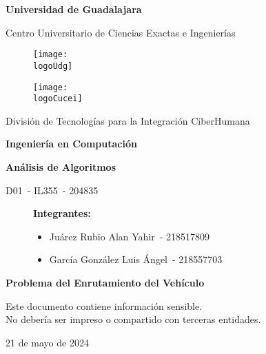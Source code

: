 \documentclass[10pt,twocolumn,letterpaper]{article}
\date{}
\title{
	\vspace*{-1cm}	\fontsize{24}{28.8}\selectfont \theTitle
}
\author{\theAuthor}
\author{\bAuthor}
\affil{\small
	\textit{CENTRO UNIVERSITARIO DE CIENCIAS}\\
	\textit{EXACTAS E INGENIERÍAS, (CUCEI, UDG)}
}
\affil{
	\fontfamily{pcr}\selectfont
	\theAuthorMail\\
	\fontfamily{pcr}\selectfont
	\bAuthorMail\\
	\vspace*{-18pt}
}
\newcommand{\logoUdg}{logo-udg.jpg}
\newcommand{\logoCucei}{logo-cucei.jpg}
\newcommand{\universidad}{Universidad de Guadalajara}
\newcommand{\cede}{Centro Universitario de Ciencias Exactas e Ingenierías}
\newcommand{\materia}{Análisis de Algoritmos}
\newcommand{\carrera}{Ingeniería en Computación}
\newcommand{\division}{División de Tecnologías para la Integración CiberHumana}
\newcommand{\theTitle}{Problema del Enrutamiento del Vehículo}
\newcommand{\seccion}{D01}
\newcommand{\nrc}{204835}
\newcommand{\clave}{IL355}
\newcommand{\startDate}{21 de mayo de 2024}
\newcommand{\theAuthor}{Juárez Rubio Alan Yahir}
\newcommand{\bAuthor}{García González Luis Ángel}
\newcommand{\theAuthorCode}{218517809}
\newcommand{\bAuthorCode}{218557703}
\newcommand{\nl}{\par\vspace{0.4cm}}
\begin{document}

\begin{titlepage}
	\centering
	{\huge\textbf{\universidad}}\par\vspace{0.6cm}
	{\LARGE{\cede}}\vfill
	
	\begin{figure}[h]
		\begin{minipage}[t]{0.45\textwidth}
			\centering
			\texttt{[image: \\logoUdg]}
		\end{minipage}
		\hfill
		\begin{minipage}[t]{0.45\textwidth}
			\centering
			\texttt{[image: \\logoCucei]}
		\end{minipage}
	\end{figure}\vfill
	
	\Large{
		\division\nl
		\textbf{\carrera}\nl
		\textbf{\materia}\par\vspace{1pt}
		\seccion\ - \clave\ - \nrc\vfill
	}

	\begin{figure}[h]
		\centering
		\begin{minipage}[t]{0.75\textwidth}
			{\Large
				\textbf{Integrantes:}\par\vspace{8pt}
				\begin{itemize}
					\item \theAuthor\ - \theAuthorCode
					\item \bAuthor\ - \bAuthorCode
				\end{itemize}
			}
		\end{minipage}
	\end{figure}\vfill

	{\LARGE{\textbf{\theTitle}}}\vfill
	
	\begin{tcolorbox}[colback=red!5!white, colframe=red!75!black]
		\centering
		Este documento contiene información sensible.\\
		No debería ser impreso o compartido con terceras entidades.
	\end{tcolorbox}\vfill

	{\large \startDate}\par
\end{titlepage}

\maketitle
\end{document}
